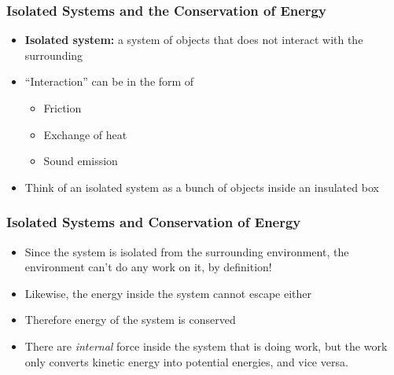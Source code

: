 \documentclass[12pt,compress,aspectratio=169]{beamer}
\newcommand{\eq}[2]{\vspace{#1}{\Large\begin{displaymath}#2\end{displaymath}}}
\begin{document}
%
%
%  
%
%




\begin{frame}
  \frametitle{Isolated Systems and the Conservation of Energy}
  \begin{itemize}
  \item\textbf{Isolated system:} a system of objects that does not interact with
    the surrounding
  \item ``Interaction'' can be in the form of
    \begin{itemize}
    \item Friction
    \item Exchange of heat
    \item Sound emission
    \end{itemize}
  \item Think of an isolated system as a bunch of objects inside an insulated
    box
  \end{itemize}
  \begin{center}
  \end{center}
\end{frame}


\begin{frame}
  \frametitle{Isolated Systems and Conservation of Energy}
  \begin{itemize}
  \item Since the system is isolated from the surrounding environment, the
    environment can't do any work on it, by definition!
  \item Likewise, the energy inside the system cannot escape either
  \item Therefore energy of the system is conserved
  \item There are \emph{internal} force inside the system that is doing work,
    but the work only converts kinetic energy into potential energies, and vice
    versa.
  \end{itemize}
\end{frame}
\end{document}
